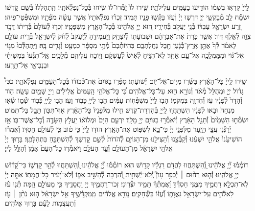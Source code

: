 \documentclass[twoside, openany, parskip=half, 11pt]{book}
\begin{document}
לַֽייָ֙ קִרְא֣וּ בִשְׁמ֔וֹ
הוֹדִ֥יעוּ בָעַמִּ֖ים עֲלִילֹתָֽיו׃
שִׁ֤ירוּ לוֹ֙ זַמְּ֯רוּ־ל֔וֹ שִׂ֖יחוּ בְּ֯כׇל־נִפְלְ֯אֹתָֽיו׃
הִֽתְהַלְלוּ֙ בְּ֯שֵׁ֣ם קׇדְשׁ֔וֹ יִשְׂמַ֕ח לֵ֖ב מְ֯בַקְשֵׁ֥י יְיָ׃
דִּרְשׁ֤וּ יְיָ֙ וְ֯עֻזּ֔וֹ בַּקְּ֯שׁ֥וּ פָנָ֖יו תָּמִֽיד׃
זִכְר֗וּ נִפְלְ֯אֹתָיו֙ אֲשֶׁ֣ר עָשָׂ֔ה מֹפְ֯תָ֖יו וּמִשְׁפְּ֯טֵי־פִֽיהוּ׃
זֶ֚רַע יִשְׂרָאֵ֣ל עַבְדּ֔וֹ בְּ֯נֵ֥י יַעֲקֹ֖ב בְּ֯חִירָֽיו׃
ה֚וּא יְיָ֣ אֱלֹהֵ֔ינוּ בְּ֯כׇל־הָאָ֖רֶץ מִשְׁפָּטָֽיו׃
זִכְר֤וּ לְ֯עוֹלָם֙ בְּ֯רִית֔וֹ דָּבָ֥ר צִוָּ֖ה לְ֯אֶ֥לֶף דּֽוֹר׃
אֲשֶׁ֤ר כָּרַת֙ אֶת־אַבְרָהָ֔ם וּשְׁבוּעָת֖וֹ לְ֯יִצְחָֽק׃
וַיַּעֲמִידֶ֤הָ לְ֯יַֽעֲקֹב֙ לְ֯חֹ֔ק לְ֯יִשְׂרָאֵ֖ל בְּ֯רִ֥ית עוֹלָֽם׃
לֵאמֹ֗ר לְ֯ךָ֙ אֶתֵּ֣ן אֶֽרֶץ־כְּ֯נָ֔עַן חֶ֖בֶל נַחֲלַתְכֶֽם׃
בִּהְיֽוֹתְ֯כֶם֙ מְ֯תֵ֣י מִסְפָּ֔ר כִּמְעַ֖ט וְ֯גָרִ֥ים בָּֽהּ׃
וַיִּֽתְהַלְּ֯כוּ֙ מִגּ֣וֹי אֶל־גּ֔וֹי וּמִמַּמְלָכָ֖ה אֶל־עַ֥ם אַחֵֽר׃
לֹֽא־הִנִּ֤יחַ לְ֯אִישׁ֙ לְ֯עׇשְׁקָ֔ם וַיּ֥וֹכַח עֲלֵיהֶ֖ם מְ֯לָכִֽים׃
אַֽל־תִּגְּ֯עוּ֙ בִּמְשִׁיחָ֔י וּבִנְבִיאַ֖י אַל־תָּרֵֽעוּ׃

שִׁ֤ירוּ לַֽייָ֙ כׇּל־הָאָ֔רֶץ בַּשְּׂ֯ר֥וּ מִיּֽוֹם־אֶל־י֖וֹם יְ֯שׁוּעָתֽוֹ׃
סַפְּ֯ר֤וּ בַגּוֹיִם֙ אֶת־כְּ֯בוֹד֔וֹ בְּ֯כׇל־הָעַמִּ֖ים נִפְלְ֯אֹתָֽיו׃
ככִּי֩ גָד֨וֹל יְיָ֤ וּמְהֻלָּל֙ מְ֯אֹ֔ד וְ֯נוֹרָ֥א ה֖וּא עַל־כׇּל־אֱלֹהִֽים׃
כִּ֠י כׇּל־אֱלֹהֵ֤י הָֽעַמִּים֙ אֱלִילִ֔ים וַייָ֖ שָׁמַ֥יִם עָשָֽׂה׃
ה֤וֹד וְ֯הָדָר֙ לְ֯פָנָ֔יו עֹ֥ז וְ֯חֶדְוָ֖ה בִּמְקֹמֽוֹ׃
הָב֤וּ לַֽייָ֙ מִשְׁפְּ֯ח֣וֹת עַמִּ֔ים הָב֥וּ לַייָ֖ כָּב֥וֹד וָעֹֽז׃
הָב֥וּ לַֽייָ֖ כְּ֯ב֣וֹד שְׁ֯מ֑וֹ שְׂ֯א֤וּ מִנְחָה֙ וּבֹ֣אוּ לְ֯פָנָ֔יו
הִשְׁתַּחֲו֥וּ לַֽייָ֖ בְּ֯הַדְרַת־קֹֽדֶשׁ׃ חִ֤ילוּ מִלְּ֯פָנָיו֙ כׇּל־הָאָ֔רֶץ
אַף־תִּכּ֥וֹן תֵּבֵ֖ל בַּל־תִּמּֽוֹט׃ יִשְׂמְ֯ח֤וּ הַשָּׁמַ֙יִם֙ וְ֯תָגֵ֣ל הָאָ֔רֶץ
וְ֯יֹאמְ֯ר֥וּ בַגּוֹיִ֖ם יְיָ֥ מָלָֽךְ׃ יִרְעַ֤ם הַיָּם֙ וּמְלוֹא֔וֹ
יַעֲלֹ֥ץ הַשָּׂדֶ֖ה וְ֯כׇל־אֲשֶׁר־בּֽוֹ׃ אָ֥ז יְ֯רַנְּ֯נ֖וּ עֲצֵ֣י הַיָּ֑עַר
מִלִּפְנֵ֣י יְיָ֔ כִּי־בָ֖א לִשְׁפּ֥וֹט אֶת־הָאָֽרֶץ׃ הוֹד֤וּ לַֽייָ֙ כִּ֣י ט֔וֹב
כִּ֥י לְ֯עוֹלָ֖ם חַסְדּֽוֹ׃ וְ֯אִמְר֕וּ הוֹשִׁיעֵ֙נוּ֙ אֱלֹהֵ֣י יִשְׁעֵ֔נוּ
וְ֯קַבְּ֯צֵ֥נוּ וְ֯הַצִּילֵ֖נוּ מִן־הַגּוֹיִ֑ם לְ֯הֹדוֹת֙ לְ֯שֵׁ֣ם קׇדְשֶׁ֔ךָ
לְ֯הִשְׁתַּבֵּ֖חַ בִּתְהִלָּתֶֽךָ׃ בָּר֤וּךְ יְיָ֙ אֱלֹהֵ֣י יִשְׂרָאֵ֔ל
מִן־הָעוֹלָ֖ם וְ֯עַ֣ד הָעֹלָ֑ם וַיֹּאמְ֯ר֤וּ כׇל־הָעָם֙ אָמֵ֔ן וְ֯הַלֵּ֖ל לַייָ׃

\newcommand{\negline}{\vspace{-\baselineskip}}

\negline

%
רוֹמְ֯מ֡וּ יְ֘יָ֤ אֱלֹהֵ֗ינוּ וְֽ֭֯הִשְׁתַּחֲווּ לַהֲדֹ֥ם רַגְלָ֗יו קָד֥וֹשׁ הֽוּא׃
רוֹמְ֯מ֡וּ יְ֘יָ֤ אֱלֹהֵ֗ינוּ וְֽ֭֯הִשְׁתַּחֲווּ לְ֯הַ֣ר קׇדְשׁ֑וֹ כִּי־קָ֝ד֗וֹשׁ יְיָ֥ אֱלֹהֵֽינוּ׃
%
וְ֯ה֤וּא רַח֨וּם ׀ יְ֯כַפֵּ֥ר עָוֺן֮ וְֽ֯לֹא־יַֽ֫שְׁחִ֥ית וְ֭֯הִרְבָּה לְ֯הָשִׁ֣יב אַפּ֑וֹ
וְ֯לֹא־יָ֝עִ֗יר כׇּל־חֲמָתֽוֹ׃
%
אַתָּ֤ה יְיָ֗ לֹֽא־תִכְלָ֣א רַחֲמֶ֣יךָ מִמֶּ֑נִּי חַסְדְּ֯ךָ֥ וַ֝אֲמִתְּ֯ךָ֗ תָּמִ֥יד יִצְּ֯רֽוּנִי׃
זְכֹר־רַחֲמֶ֣יךָ יְיָ֭ וַחֲסָדֶ֑יךָ כִּ֖י מֵעוֹלָ֣ם הֵֽמָּה׃
תְּ֯נ֥וּ עֹ֗ז לֵאלֹ֫הִ֥ים עַֽל־יִשְׂרָאֵ֥ל גַּאֲוָת֑וֹ וְ֯֝עֻזּ֗וֹ בַּשְּׁ֯חָקִֽים׃
נ֤וֹרָ֥א אֱלֹהִ֗ים מִֽמִּקְדָּ֫שֶׁ֥יךָ אֵ֤ל יִשְׂרָאֵ֗ל
ה֤וּא נֹתֵ֨ן ׀ עֹ֖ז וְ֯תַעֲצֻמ֥וֹת לָעָ֗ם בָּר֥וּךְ אֱלֹהִֽים׃
\end{document}
